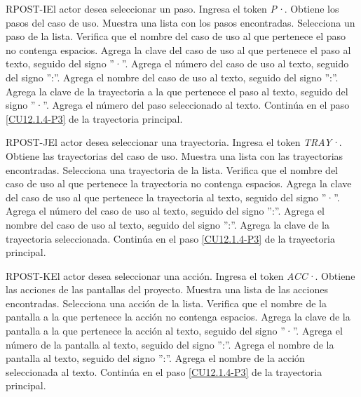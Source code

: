 	\begin{UCtrayectoriaA}{RPOST-I}{El actor desea seleccionar un paso.}
		\UCpaso[\UCactor] Ingresa el token {\em P·}. 
		\UCpaso[\UCsist] Obtiene los pasos del caso de uso.
		\UCpaso[\UCsist] Muestra una lista con los pasos encontradas.
		\UCpaso[\UCactor] Selecciona un paso de la lista.
		\UCpaso[\UCsist] Verifica que el nombre del caso de uso al que pertenece el paso no contenga espacios. 
		\UCpaso[\UCsist] Agrega la clave del caso de uso al que pertenece el paso al texto, seguido del signo ''·''.
		\UCpaso[\UCsist] Agrega el número del caso de uso al texto, seguido del signo '':''.
		\UCpaso[\UCsist] Agrega el nombre del caso de uso al texto, seguido del signo '':''.
		\UCpaso[\UCsist] Agrega la clave de la trayectoria a la que pertenece el paso al texto, seguido del signo ''·''.
		\UCpaso[\UCsist] Agrega el número del paso seleccionado al texto.
		\UCpaso Continúa en el paso \ref{CU12.1.4-P3} de la trayectoria principal.
	\end{UCtrayectoriaA}

	\begin{UCtrayectoriaA}{RPOST-J}{El actor desea seleccionar una trayectoria.}
		\UCpaso[\UCactor] Ingresa el token {\em TRAY·}. 
		\UCpaso[\UCsist] Obtiene las trayectorias del caso de uso.
		\UCpaso[\UCsist] Muestra una lista con las trayectorias encontradas.
		\UCpaso[\UCactor] Selecciona una trayectoria de la lista.
		\UCpaso[\UCsist] Verifica que el nombre del caso de uso al que pertenece la trayectoria no contenga espacios. 
		\UCpaso[\UCsist] Agrega la clave del caso de uso al que pertenece la trayectoria al texto, seguido del signo ''·''.
		\UCpaso[\UCsist] Agrega el número del caso de uso al texto, seguido del signo '':''.
		\UCpaso[\UCsist] Agrega el nombre del caso de uso al texto, seguido del signo '':''.
		\UCpaso[\UCsist] Agrega la clave de la trayectoria seleccionada.
		\UCpaso Continúa en el paso \ref{CU12.1.4-P3} de la trayectoria principal.
	\end{UCtrayectoriaA}

	\begin{UCtrayectoriaA}{RPOST-K}{El actor desea seleccionar una acción.}
		\UCpaso[\UCactor] Ingresa el token {\em ACC·}. 
		\UCpaso[\UCsist] Obtiene las acciones de las pantallas del proyecto.
		\UCpaso[\UCsist] Muestra una lista de las acciones encontradas.
		\UCpaso[\UCactor] Selecciona una acción de la lista.
		\UCpaso[\UCsist] Verifica que el nombre de la pantalla a la que pertenece la acción no contenga espacios. 
		\UCpaso[\UCsist] Agrega la clave de la pantalla a la que pertenece la acción al texto, seguido del signo ''·''.
		\UCpaso[\UCsist] Agrega el número de la pantalla al texto, seguido del signo '':''.
		\UCpaso[\UCsist] Agrega el nombre de la pantalla al texto, seguido del signo '':''.
		\UCpaso[\UCsist] Agrega el nombre de la acción seleccionada al texto.
		\UCpaso Continúa en el paso \ref{CU12.1.4-P3} de la trayectoria principal.
	\end{UCtrayectoriaA}

